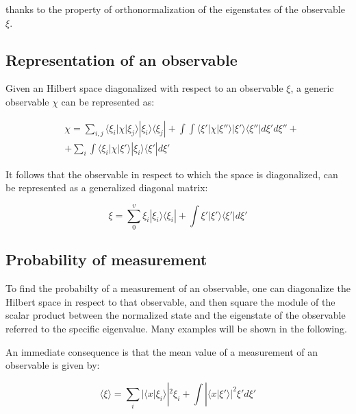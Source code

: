 \documentclass{article}
\begin{document}
thanks to the property of orthonormalization of the eigenstates of the observable $\xi$.

\subsection{Representation of an observable}

\begin{tcolorbox}[colframe=gray!50, colback=gray!10, coltitle=black, title=Observable Representation]
  Given an Hilbert space diagonalized with respect to an observable $\xi$, a generic observable $\chi$ can be represented as:

  \begin{equation}
    \begin{aligned}
       & \chi= \sum_{i,j} \langle \xi_i|\chi|\xi_j\rangle |\xi_i\rangle \langle \xi_j|+ \int\int \langle \xi'|\chi|\xi''\rangle |\xi'\rangle \langle \xi''| d\xi'd\xi'' + \\
       & + \sum_i\int \langle \xi_i|\chi|\xi'\rangle |\xi_i\rangle \langle \xi'|d\xi'
    \end{aligned}
  \end{equation}

\end{tcolorbox}

It follows that the observable in respect to which the space is diagonalized, can be represented as a generalized diagonal matrix:

\begin{equation}
  \xi = \sum_{0}^{v} \xi_i|\xi_i\rangle \langle \xi_i|+ \int \xi'|\xi'\rangle \langle \xi'|d\xi'
\end{equation}

\subsection{Probability of measurement}

To find the probabilty of a measurement of an observable, one can diagonalize the Hilbert space in respect to that observable,
and then square the module of the scalar product between the normalized state and the eigenstate of the observable referred to the specific eigenvalue.
Many examples will be shown in the following.

An immediate consequence is that the mean value of a measurement of an observable is given by:

\begin{tcolorbox}[colframe=gray!50, colback=gray!10, coltitle=black, title=Mean Value of an Observable]
  \begin{equation}
    \langle \xi\rangle  = \sum_i |\langle x|\xi_i\rangle |^2 \xi_i + \int |\langle x|\xi'\rangle |^2 \xi' d\xi'
  \end{equation}
\end{tcolorbox}
\end{document}
